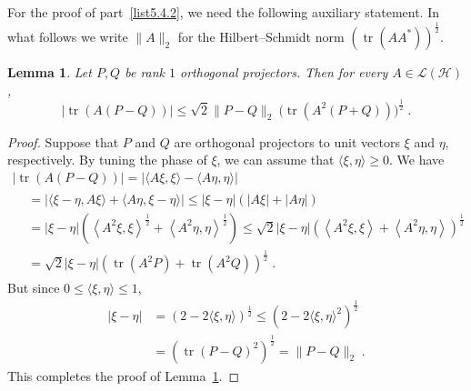 \documentclass[11pt]{article}
\newtheorem{lemm}[theo]{Lemma}
\theoremstyle{definition}
\numberwithin{equation}{section}
\numberwithin{figure}{section}
\numberwithin{table}{section}
\DeclareMathOperator{\tr}{tr}
\newcommand{\cH}{{\mathcal{H}}}
\renewcommand\leq {\leqslant}
\renewcommand\geq {\geqslant}
\newcommand\< {\mathcal{h}}
\renewcommand\> {\mathcal{i}}
\newcommand*\cL{\mathscr{L}}
\begin{document}
For the proof of part~\eqref{list5.4.2}, we need the following auxiliary statement. In what follows we write $\|A\|_2$ for the Hilbert--Schmidt norm $(\tr(AA^*))^{\frac{1}{2}}$.

\begin{lemm}\label{lemma-tr}
Let $P,Q$ be rank $1$ orthogonal projectors.
Then for every $A \in \cL(\cH)$,
\[
|\tr (A(P-Q))| \leq \sqrt{2}\|P-Q\|_2 \ \big(\tr (A^2(P+Q))\big)^{\frac{1}{2}}\;.
\]
\end{lemm}

\begin{proof}
Suppose that $P$ and $Q$ are orthogonal projectors to
unit vectors $\xi$ and $\eta$, respectively. By tuning the phase of $\xi$, we can assume that $\langle \xi, \eta \rangle \geq 0$. We have
\begin{multline*}
|\tr (A(P-Q))| = |\langle A\xi,\xi\rangle - \langle A\eta,\eta\rangle|
\\
\begin{aligned}
&= |\langle \xi-\eta, A\xi \rangle + \langle A\eta, \xi-\eta \rangle |\leq |\xi-\eta| (|A\xi|+|A\eta|)
\\
&= |\xi-\eta|\left(\left\langle A^2\xi,\xi\right\rangle^{\frac{1}{2}} + \left\langle A^2\eta,\eta\right\rangle^{\frac{1}{2}}\right) \leq \sqrt{2}|\xi-\eta|\left(\left\langle A^2\xi,\xi\right\rangle + \left\langle A^2\eta,\eta\right\rangle\right)^{\frac{1}{2}}
\\
&=\sqrt{2}|\xi-\eta|\left(\tr(A^2P)+\tr(A^2Q)\right)^{\frac{1}{2}} \;.
\end{aligned}
\end{multline*}
But since $0 \leq \langle \xi, \eta \rangle \leq 1$,
\begin{align*}
|\xi-\eta| &= \left(2 -2\langle \xi, \eta \rangle\right)^{\frac{1}{2}} \leq \left(2 -2\langle \xi, \eta \rangle^2\right)^{\frac{1}{2}}
\\
&= \left(\tr(P-Q)^2\right)^{\frac{1}{2}} = \|P-Q\|_2\;.
\end{align*}
This completes the proof of Lemma~\ref{lemma-tr}.
\end{proof}
\end{document}
